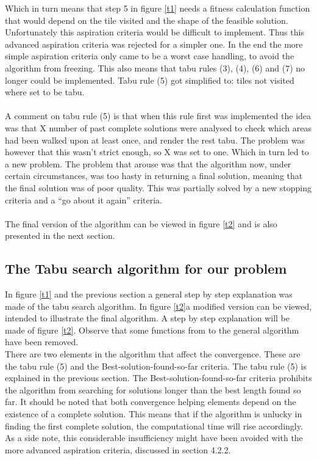 Which in turn means that step 5 in figure \ref{t1} needs a fitness calculation function that would depend on the tile visited and the shape of the feasible solution. Unfortunately this aspiration criteria would be difficult to implement. Thus this advanced aspiration criteria was rejected for a simpler one. In the end the more simple aspiration criteria only came to be a worst case handling, to avoid the algorithm from freezing. This also means that tabu rules (3), (4), (6) and (7) no longer could be implemented. Tabu rule (5) got simplified to: tiles not visited where set to be tabu.\\
\\A comment on tabu rule (5) is that when this rule first was implemented the idea was that X number of past complete solutions were analysed to check which areas had been walked upon at least once, and render the rest tabu. The problem was however that this wasn't strict enough, so X was set to one. Which in turn led to a new problem. The problem that arouse was that the algorithm now, under certain circumstances, was too hasty in returning a final solution, meaning that the final solution was of poor quality. This was partially solved by a new stopping criteria and a ``go about it again'' criteria.\\
\\The final version of the algorithm can be viewed in figure \ref{t2} and is also presented in the next section.
\subsection{The Tabu search algorithm for our problem}
In figure \ref{t1} and the previous section a general step by step explanation was made of the tabu search algorithm. In figure \ref{t2}a modified version can be viewed, intended to illustrate the final algorithm. A step by step explanation will be made of figure \ref{t2}. Observe that some functions from to the general algorithm have been removed.\\

There are two elements in the algorithm that affect the convergence. These are the tabu rule (5) and the Best-solution-found-so-far criteria. The tabu rule (5) is explained in the previous section. The Best-solution-found-so-far criteria prohibits the algorithm from searching for solutions longer than the best length found so far. It should be noted that both convergence helping elements depend on the existence of a complete solution. This means that if the algorithm is unlucky in finding the first complete solution, the computational time will rise accordingly. As a side note, this considerable insufficiency might have been avoided with the more advanced aspiration criteria, discussed in section 4.2.2.

